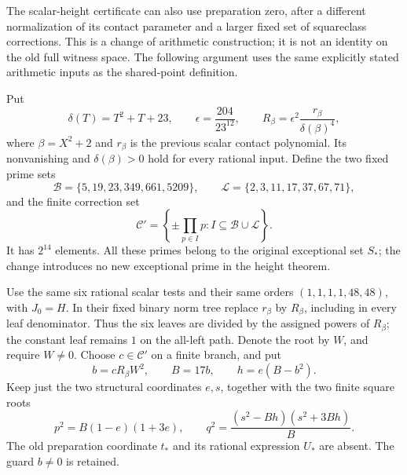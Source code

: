 \documentclass[11pt]{article}
\theoremstyle{definition}
\begin{document}
The scalar-height certificate can also use preparation zero, after a
different normalization of its contact parameter and a larger fixed set
of squareclass corrections.  This is a change of arithmetic construction;
it is not an identity on the old full witness space.  The following
argument uses the same explicitly stated arithmetic inputs as the
shared-point definition.

Put
\[
 \delta(T)=T^2+T+23,\qquad \epsilon=\frac{204}{23^{12}},
 \qquad R_\beta=\epsilon^2\frac{r_\beta}{\delta(\beta)^4},
\]
where $\beta=X^2+2$ and $r_\beta$ is the previous scalar contact
polynomial.  Its nonvanishing and $\delta(\beta)>0$ hold for every
rational input.  Define the two fixed prime sets
\[
 \mathcal B=\{5,19,23,349,661,5209\},\qquad
 \mathcal L=\{2,3,11,17,37,67,71\},
\]
and the finite correction set
\[
 \mathcal C'=\left\{\pm\prod_{p\in I}p:
                   I\subseteq\mathcal B\cup\mathcal L\right\}.
\]
It has $2^{14}$ elements.  All these primes belong to the original
exceptional set $S_*$; the change introduces no new exceptional prime
in the height theorem.

Use the same six rational scalar tests and their same orders
$(1,1,1,1,48,48)$, with $J_0=H$.  In their fixed binary norm tree
replace $r_\beta$ by $R_\beta$, including in every leaf denominator.
Thus the six leaves are divided by the assigned powers of $R_\beta$;
the constant leaf remains $1$ on the all-left path.  Denote the root
by $W$, and require $W\ne0$.  Choose $c\in\mathcal C'$ on a finite
branch, and put
\[
 b=cR_\beta W^2,\qquad B=17b,\qquad h=e(B-b^2).
\]
Keep just the two structural coordinates $e,s$, together with the
two finite square roots
\[
 p^2=B(1-e)(1+3e),\qquad
 q^2=\frac{(s^2-Bh)(s^2+3Bh)}B.
\]
The old preparation coordinate $t_*$ and its rational expression
$U_*$ are absent.  The guard $b\ne0$ is retained.
\end{document}
